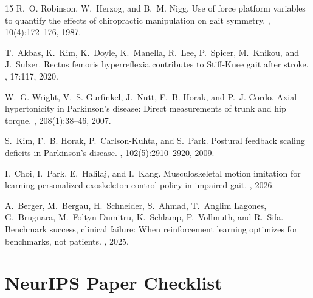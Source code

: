 \documentclass{article}
\begin{document}
\begin{thebibliography}{15}
R.~O. Robinson, W.~Herzog, and B.~M. Nigg.
\newblock Use of force platform variables to quantify the effects of chiropractic manipulation on gait symmetry.
, 10(4):172--176, 1987.

T.~Akbas, K.~Kim, K.~Doyle, K.~Manella, R.~Lee, P.~Spicer, M.~Knikou, and J.~Sulzer.
\newblock Rectus femoris hyperreflexia contributes to Stiff-Knee gait after stroke.
, 17:117, 2020.

W.~G. Wright, V.~S. Gurfinkel, J.~Nutt, F.~B. Horak, and P.~J. Cordo.
\newblock Axial hypertonicity in Parkinson's disease: Direct measurements of trunk and hip torque.
, 208(1):38--46, 2007.

S.~Kim, F.~B. Horak, P.~Carlson-Kuhta, and S.~Park.
\newblock Postural feedback scaling deficits in Parkinson's disease.
, 102(5):2910--2920, 2009.

I.~Choi, I.~Park, E.~Halilaj, and I.~Kang.
\newblock Musculoskeletal motion imitation for learning personalized exoskeleton control policy in impaired gait.
, 2026.

A.~Berger, M.~Bergau, H.~Schneider, S.~Ahmad, T.~Anglim Lagones, G.~Brugnara, M.~Foltyn-Dumitru, K.~Schlamp, P.~Vollmuth, and R.~Sifa.
\newblock Benchmark success, clinical failure: When reinforcement learning optimizes for benchmarks, not patients.
, 2025.

\end{thebibliography}

\section*{NeurIPS Paper Checklist}
\end{document}
